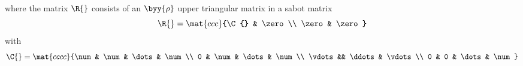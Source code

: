 where the matrix $\R{}$ consists of an $\byy{\rho}$ upper triangular matrix in a sabot matrix
\begin{equation}
  \R{} = \mat{ccc}{\C{} & \zero \\ \zero & \zero}
\end{equation}
with
\begin{equation}
  \C{} = \mat{cccc}
        {\num   & \num & \dots & \num \\
          0     & \num & \dots & \num \\
         \vdots && \ddots & \vdots    \\
         0 & 0 & \dots & \num}
\end{equation}



\endinput